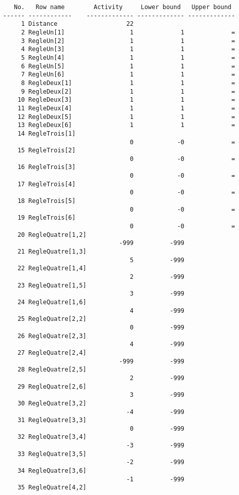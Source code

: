 \begin{lstlisting}
   No.   Row name        Activity     Lower bound   Upper bound
------ ------------    ------------- ------------- -------------
     1 Distance                   22
     2 RegleUn[1]                  1             1             =
     3 RegleUn[2]                  1             1             =
     4 RegleUn[3]                  1             1             =
     5 RegleUn[4]                  1             1             =
     6 RegleUn[5]                  1             1             =
     7 RegleUn[6]                  1             1             =
     8 RegleDeux[1]                1             1             =
     9 RegleDeux[2]                1             1             =
    10 RegleDeux[3]                1             1             =
    11 RegleDeux[4]                1             1             =
    12 RegleDeux[5]                1             1             =
    13 RegleDeux[6]                1             1             =
    14 RegleTrois[1]
                                   0            -0             =
    15 RegleTrois[2]
                                   0            -0             =
    16 RegleTrois[3]
                                   0            -0             =
    17 RegleTrois[4]
                                   0            -0             =
    18 RegleTrois[5]
                                   0            -0             =
    19 RegleTrois[6]
                                   0            -0             =
    20 RegleQuatre[1,2]
                                -999          -999
    21 RegleQuatre[1,3]
                                   5          -999
    22 RegleQuatre[1,4]
                                   2          -999
    23 RegleQuatre[1,5]
                                   3          -999
    24 RegleQuatre[1,6]
                                   4          -999
    25 RegleQuatre[2,2]
                                   0          -999
    26 RegleQuatre[2,3]
                                   4          -999
    27 RegleQuatre[2,4]
                                -999          -999
    28 RegleQuatre[2,5]
                                   2          -999
    29 RegleQuatre[2,6]
                                   3          -999
    30 RegleQuatre[3,2]
                                  -4          -999
    31 RegleQuatre[3,3]
                                   0          -999
    32 RegleQuatre[3,4]
                                  -3          -999
    33 RegleQuatre[3,5]
                                  -2          -999
    34 RegleQuatre[3,6]
                                  -1          -999
    35 RegleQuatre[4,2]

\end{lstlisting}
